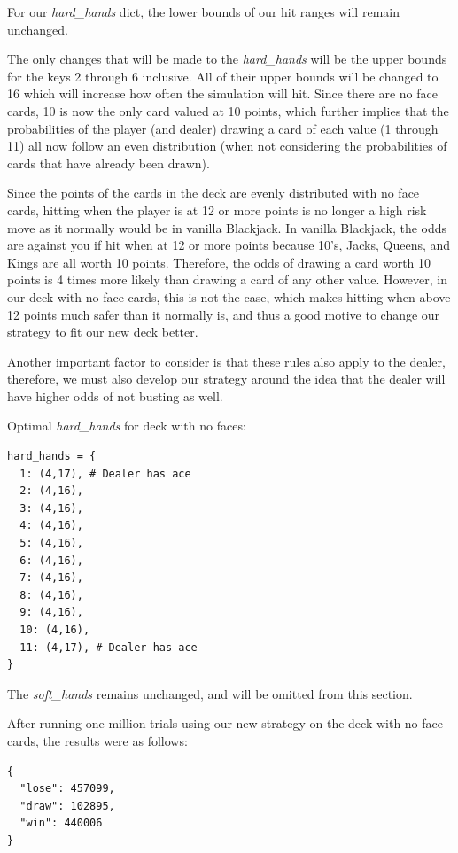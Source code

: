 \documentclass{article}
\begin{document}
{			For our \textit{hard\_hands} dict, the lower bounds of our hit ranges will remain unchanged. 

			The only changes that will be made to the \textit{hard\_hands} will be the upper bounds for the keys 2 through 6 inclusive.
			All of their upper bounds will be changed to 16 which will increase how often the simulation will hit. 
			Since there are no face cards, 10 is now the only card valued at 10 points,
			which further implies that the probabilities of the player (and dealer) drawing a card of each value (1 through 11) all now follow an even 
			distribution (when not considering the probabilities of cards that have already been drawn). 

			Since the points of the cards in the deck are evenly distributed with no face cards, hitting when the player is at 12 or more points 
			is no longer a high risk move as it normally would be in vanilla Blackjack. In vanilla Blackjack, the odds are against you if hit when 
			at 12 or more points because 10's, Jacks, Queens, and Kings are all worth 10 points. Therefore, the odds of drawing a card worth 
			10 points is 4 times more likely than drawing a card of any other value. However, in our deck with no face cards, this is not the case,
			which makes hitting when above 12 points much safer than it normally is, and thus a good motive to change our strategy to fit our new
			deck better.

			Another important factor to consider is that these rules also apply to the dealer, therefore, we must also develop our strategy
			around the idea that the dealer will have higher odds of not busting as well.

       	\vspace{1cm} 
		Optimal \textit{hard\_hands} for deck with no faces:
        \begin{verbatim}
hard_hands = {
  1: (4,17), # Dealer has ace
  2: (4,16),
  3: (4,16),
  4: (4,16),
  5: (4,16),
  6: (4,16),
  7: (4,16),
  8: (4,16),
  9: (4,16),
  10: (4,16),
  11: (4,17), # Dealer has ace
}
        \end{verbatim}
		
		The \textit{soft\_hands} remains unchanged, and will be omitted from this section.

        After running one million trials using our new strategy on the deck with no face cards, the results
		were as follows:

        \begin{verbatim}
{
  "lose": 457099,
  "draw": 102895,
  "win": 440006
}
        \end{verbatim}

}
\end{document}
